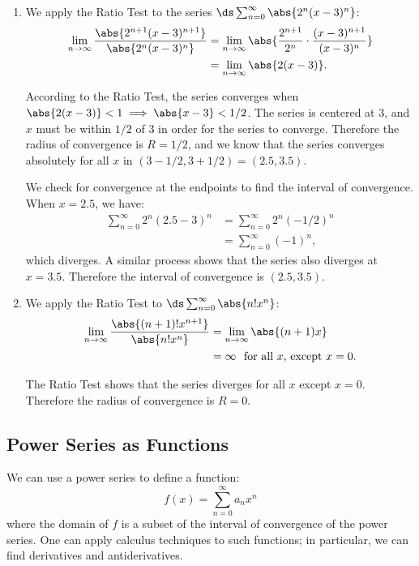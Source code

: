 {\begin{enumerate}
	\item		We apply the Ratio Test to the series $\ds\sum_{n=0}^\infty \abs{2^n(x-3)^n}$:
	\begin{align*}
	\lim_{n\to\infty} \frac{\abs{2^{n+1}(x-3)^{n+1}}}{\abs{2^n(x-3)^n}} &= \lim_{n\to\infty} \abs{\frac{2^{n+1}}{2^n}\cdot\frac{(x-3)^{n+1}}{(x-3)^n}}\\
			&=\lim_{n\to\infty} \abs{2(x-3)}.
	\end{align*}
	
According to the Ratio Test, the series converges when $\abs{2(x-3)}<1 \implies \abs{x-3}< 1/2$. The series is centered at 3, and $x$ must be within $1/2$ of 3 in order for the series to converge. Therefore the radius of convergence is $R=1/2$, and we know that the series converges absolutely for all $x$ in $(3-1/2,3+1/2) = (2.5, 3.5)$.

We check for convergence at the endpoints to find the interval of convergence. When $x=2.5$, we have:
\begin{align*}
\sum_{n=0}^\infty 2^n(2.5-3)^n &= \sum_{n=0}^\infty 2^n(-1/2)^n \\
			&=\sum_{n=0}^\infty (-1)^n,
\end{align*}
which diverges. A similar process shows that the series also diverges at $x=3.5$. Therefore the interval of convergence is $(2.5, 3.5)$.

\item		We apply the Ratio Test to $\ds \sum_{n=0}^\infty \abs{n!x^n}$:
\begin{align*}
\lim_{n\to\infty} \frac{\abs{ (n+1)!x^{n+1}}}{\abs{n!x^n}} &= \lim_{n\to\infty} \abs{(n+1)x}\\
		&= \infty\ \text{ for all $x$, except $x=0$.}
\end{align*}

The Ratio Test shows that the series diverges for all $x$ except $x=0$. Therefore the radius of convergence is $R=0$.\eoehere
\end{enumerate}}

\subsection{Power Series as Functions}

We can use a power series to define a function:
\[f(x) = \sum_{n=0}^\infty a_nx^n\]
where the domain of $f$ is a subset of the interval of convergence of the power series. One can apply calculus techniques to such functions; in particular, we can find derivatives and antiderivatives. 

